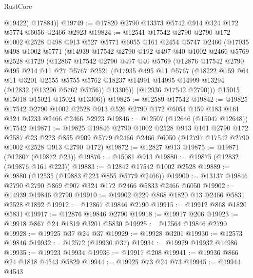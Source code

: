 \begin{lexlean}{RustCore}
\begin{coremodule}
          @19422)
        @17884))
@19749 := @17820 @2790 @13373 @5742 @914 @324 @172 @5774 @6056 @2466 @2923
@19824 := @12541
    @17542
    @2790
    @2790
    @172
    @1002
    @2528
    @498
    @913
    @527
    @5771
    @6055
    @161
    @2454
    @5747
    @2460
    (@17935
      @498
      @1002
      @5771
      (@14939
        @17542
        @2790
        @192
        @497
        @40
        @1002
        @2466
        @5769
        @2528
        @1729
        (@12867
          @17542
          @2790
          @497
          @40
          @5769
          (@12876
            @17542
            @2790
            @495
            @214
            @11
            @27
            @5767
            @2521
            (@17935
              @495
              @11
              @5767
              (@18222
                @159
                @64
                @11
                @3201
                @2555
                @5755
                @5762
                @18237
                @14991
                @14995
                @14999
                @13294
                (@12832 (@13296 @5762 @5756))
                @13306))
            (@12936 @17542 @2790)))
        @15015
        @15018
        @15021
        @15024
        @13306))
@19825 := @12589 @17542
@19842 := @19825
    @17542
    @2790
    @1002
    @2528
    @913
    @526
    @2790
    @172
    @6054
    @159
    @183
    @161
    @324
    @3233
    @2466
    @2466
    @2923
@19846 := @12507 (@12646 (@15047 @12648)) @17542
@19871 := @19825
    @19846
    @2790
    @1002
    @2528
    @913
    @161
    @2790
    @172
    @2587
    @23
    @223
    @855
    @909
    @5779
    @2466
    @2466
    @6050
    (@12797 @17542 @2790 @1002 @2528 @913 @2790 @172)
@19872 := @12827 @913
@19875 := @19871 (@12807 (@19872 @23))
@19876 := @15081 @913
@19880 := @19875 (@12832 (@19876 @161 @223))
@19883 := @12842 @17542 @1002 @2528
@19889 := @19880 (@12535 (@19883 @223 @855 @5779 @2466))
@19900 := @13137 @19846 @2790 @2790 @869 @907 @324 @172 @2466 @5833 @2466 @6050
@19902 := @14939 @19846 @2790
@19910 := @19902 @229 @868 @1820 @13 @2466 @5831 @2528 @1892
@19912 := @12867 @19846 @2790
@19915 := @19912 @868 @1820 @5831
@19917 := @12876 @19846 @2790
@19918 := @19917 @206
@19923 := @19918 @867 @24 @1819 @3201 @5830
@19925 := @12564 @19846 @2790
@19928 := @19925 @37 @24 @37
@19929 := @19928 @3201
@19930 := @12573 @19846
@19932 := @12572 (@19930 @37)
@19934 := @19929 @19932 @14986
@19935 := @19923 @19934
@19936 := @19917 @208
@19941 := @19936 @866 @24 @1818 @4543 @5829
@19944 := @19925 @73 @24 @73
@19945 := @19944 @4543

\end{coremodule}
\end{lexlean}
